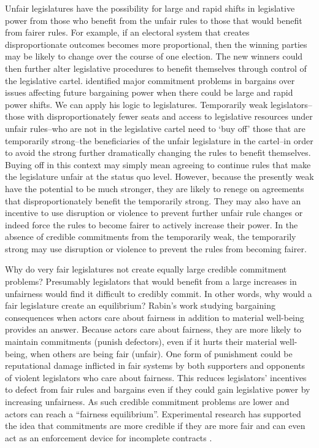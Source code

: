 \documentclass[a4paper]{article}\usepackage[]{graphicx}\usepackage[]{color}
\begin{document}
Unfair legislatures have the possibility for large and rapid shifts in legislative power from those who benefit from the unfair rules to those that would benefit from fairer rules. For example, if an electoral system that creates disproportionate outcomes becomes more proportional, then the winning parties may be likely to change over the course of one election. The new winners could then further alter legislative procedures to benefit themselves through control of the legislative cartel. \cite{Powell2004,Powell2006} identified major commitment problems in bargains over issues affecting future bargaining power when there could be large and rapid power shifts. We can apply his logic to legislatures. Temporarily weak legislators--those with disproportionately fewer seats and access to legislative resources under unfair rules--who are not in the legislative cartel need to `buy off' those that are temporarily strong--the beneficiaries of the unfair legislature in the cartel--in order to avoid the strong further dramatically changing the rules to benefit themselves. Buying off in this context may simply mean agreeing to continue rules that make the legislature unfair at the status quo level. However, because the presently weak have the potential to be much stronger, they are likely to renege on agreements that disproportionately benefit the temporarily strong. They may also have an incentive to use disruption or violence to prevent further unfair rule changes or indeed force the rules to become fairer to actively increase their power. In the absence of credible commitments from the temporarily weak, the temporarily strong may use disruption or violence to prevent the rules from becoming fairer.

Why do very fair legislatures not create equally large credible commitment problems? Presumably legislators that would benefit from a large increases in unfairness would find it difficult to credibly commit. In other words, why would a fair legislature create an equilibrium? Rabin's \citeyearpar{Rabin1993} work studying bargaining consequences when actors care about fairness in addition to material well-being provides an answer. Because actors care about fairness, they are more likely to maintain commitments (punish defectors), even if it hurts their material well-being, when others are being fair (unfair). One form of punishment could be reputational damage inflicted in fair systems by both supporters and opponents of violent legislators who care about fairness. This reduces legislators' incentives to defect from fair rules and bargains even if they could gain legislative power by increasing unfairness. As such credible commitment problems are lower and actors can reach a ``fairness equilibrium''. Experimental research has supported the idea that commitments are more credible if they are more fair \citep{Ellingsen2004} and can even act as an enforcement device for incomplete contracts \citep[see][for a review]{Fehr2008}. 
\end{document}

